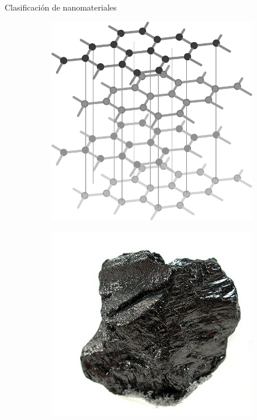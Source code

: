 \documentclass[aspectratio=169]{beamer}
\begin{document}
	\begin{frame}{Clasificación de nanomateriales}
		\begin{figure}
			\centering
			\begin{subfigure}[b]{0.15\textwidth}
				\includegraphics[width=\textwidth]{graphite_structure.pdf}
				\caption{}
				\label{fig:graphite_struct}
			\end{subfigure}
			\begin{subfigure}[b]{0.15\textwidth}
				\includegraphics[width=\textwidth]{graphite_image.png}

\end{subfigure}
\end{figure}
\end{frame}
\end{document}

